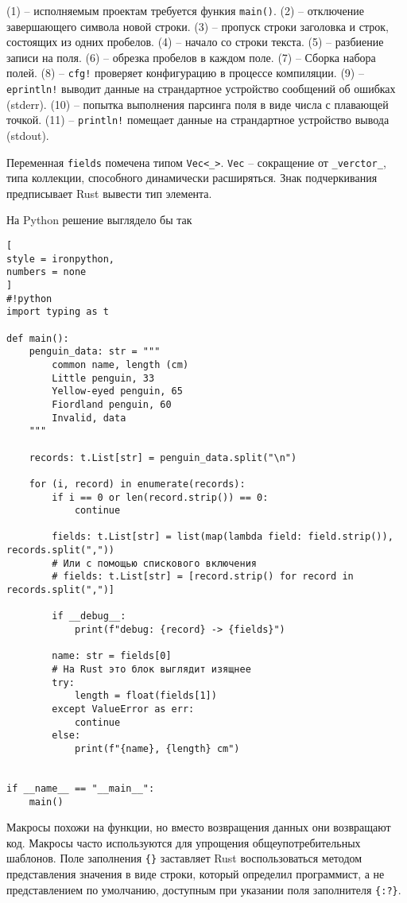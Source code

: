 \documentclass[%
	11pt,
	a4paper,
	utf8,
		]{article}
\begin{document}
(1) -- исполняемым проектам требуется функия \texttt{main()}. (2) -- отключение завершающего символа новой строки. (3) -- пропуск строки заголовка и строк, состоящих из одних пробелов. (4) -- начало со строки текста. (5) -- разбиение записи на поля. (6) -- обрезка пробелов в каждом поле. (7) -- Сборка набора полей. (8) -- \texttt{cfg!} проверяет конфигурацию в процессе компиляции. (9) -- \texttt{eprintln!} выводит данные на страндартное устройство сообщений об ошибках (stderr). (10) -- попытка выполнения парсинга поля в виде числа с плавающей точкой. (11) -- \texttt{println!} помещает данные на страндартное устройство вывода (stdout).

Переменная \texttt{fields} помечена типом \verb|Vec<_>|. \verb|Vec| -- сокращение от \verb|_verctor_|, типа коллекции, способного динамически расширяться. Знак подчеркивания предписывает Rust вывести тип элемента.

На Python решение выглядело бы так
\begin{lstlisting}[
style = ironpython,
numbers = none
]
#!python
import typing as t

def main():
    penguin_data: str = """
        common name, length (cm)
        Little penguin, 33
        Yellow-eyed penguin, 65
        Fiordland penguin, 60
        Invalid, data
    """
    
    records: t.List[str] = penguin_data.split("\n")
    
    for (i, record) in enumerate(records):
        if i == 0 or len(record.strip()) == 0:
            continue
            
        fields: t.List[str] = list(map(lambda field: field.strip()), records.split(","))
        # Или с помощью спискового включения
        # fields: t.List[str] = [record.strip() for record in records.split(",")]
        
        if __debug__:
            print(f"debug: {record} -> {fields}")
            
        name: str = fields[0]
        # На Rust это блок выглядит изящнее
        try:
            length = float(fields[1])
        except ValueError as err:
            continue
        else:
            print(f"{name}, {length} cm")
            

if __name__ == "__main__":
    main()
\end{lstlisting}

Макросы похожи на функции, но вместо возвращения данных они возвращают код. Макросы часто используются для упрощения общеупотребительных шаблонов. Поле заполнения \verb|{}| заставляет Rust воспользоваться методом представления значения в виде строки, который определил программист, а не представлением по умолчанию, доступным при указании поля заполнителя \verb|{:?}|.
\end{document}

